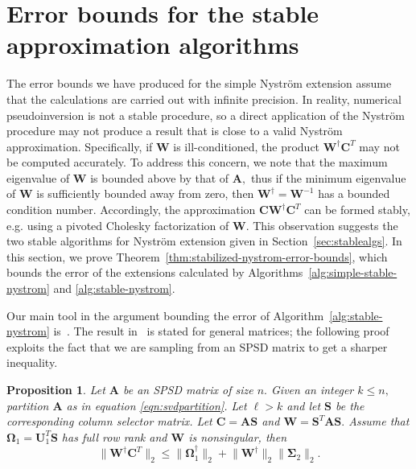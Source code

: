 \documentclass[11pt,letterpaper,twoside,reqno,nosumlimits]{amsart}
\def\pinv{\dagger}
\def\transp{T}
\newcommand{\mat}[1]{\ensuremath{\mathbf{#1}}}
\newcommand{\snorm}[1]{\ensuremath{\big\|#1\big\|_2}}
\newtheorem{prop}{Proposition}
\theoremstyle{remark}
\begin{document}
\section{Error bounds for the stable approximation algorithms}

The error bounds we have produced for the simple Nystr\"om extension assume that the calculations are carried out with infinite precision. In reality, numerical pseudoinversion is not a stable procedure, so a direct application of the Nystr\"om procedure may not produce a result that is close to a valid Nystr\"om approximation. Specifically, if $\mat{W}$ is ill-conditioned, the product $\mat{W}^\pinv \mat{C}^\transp$ may not be computed accurately. To address this concern, we note that the maximum eigenvalue of $\mat{W}$ is bounded above by that of $\mat{A},$ thus if the minimum eigenvalue of $\mat{W}$ is sufficiently bounded away from zero, then $\mat{W}^\pinv = \mat{W}^{-1}$ has a bounded condition number. Accordingly, the approximation $\mat{C} \mat{W}^\pinv \mat{C}^\transp$ can be formed stably, e.g. using a pivoted Cholesky factorization of $\mat{W}.$ This observation suggests the two stable algorithms for Nystr\"om extension given in Section~\ref{sec:stablealgs}. In this section, we prove Theorem~\ref{thm:stabilized-nystrom-error-bounds}, which bounds the error of the extensions calculated by Algorithms~\ref{alg:simple-stable-nystrom} and \ref{alg:stable-nystrom}.

Our main tool in the argument bounding the error of Algorithm~\ref{alg:stable-nystrom} is~\cite[Lemma 2.2]{CD11}. The result in~\cite[Lemma 2.2]{CD11} is stated for general matrices; the following proof exploits the fact that we are sampling from an SPSD matrix to get a sharper inequality.
\begin{prop}
 \label{prop:psd-subsampling-principle}
 Let $\mat{A}$ be an SPSD matrix of size $n.$ Given an integer $k \leq n,$ partition $\mat{A}$ as in equation \eqref{eqn:svdpartition}. Let $\ell > k$ and let $\mat{S}$ be the corresponding column selector matrix. Let $\mat{C} = \mat{A} \mat{S}$ and $\mat{W} = \mat{S}^\transp \mat{A} \mat{S}.$ Assume that $\mat{\Omega}_1 = \mat{U}_1^\transp \mat{S}$ has full row rank and $\mat{W}$ is nonsingular, then
\[
 \snorm{\mat{W}^\pinv \mat{C}^\transp} \leq \snorm{\mat{\Omega}_1^\pinv} + \snorm{\mat{W}^\pinv} \snorm{\mat{\Sigma}_2}.
\]

\end{prop}
\end{document}
